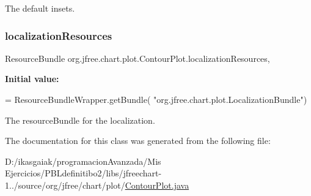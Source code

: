 The default insets. \mbox{\label{classorg_1_1jfree_1_1chart_1_1plot_1_1_contour_plot_adb8ecde059da3f439f47c0eca5efc363}} 
\subsubsection{\texorpdfstring{localization\+Resources}{localizationResources}}
{\footnotesize\ttfamily Resource\+Bundle org.\+jfree.\+chart.\+plot.\+Contour\+Plot.\+localization\+Resources\hspace{0.3cm}{\ttfamily [static]}, {\ttfamily [protected]}}

{\bfseries Initial value\+:}
\begin{DoxyCode}
= ResourceBundleWrapper.getBundle(
                    \textcolor{stringliteral}{"org.jfree.chart.plot.LocalizationBundle"})
\end{DoxyCode}
The resource\+Bundle for the localization. 

The documentation for this class was generated from the following file\+:\begin{DoxyCompactItemize}
\item 
D\+:/ikasgaiak/programacion\+Avanzada/\+Mis Ejercicios/\+P\+B\+Ldefinitibo2/libs/jfreechart-\/1../source/org/jfree/chart/plot/\mbox{\hyperlink{_contour_plot_8java}{Contour\+Plot.\+java}}\end{DoxyCompactItemize}
